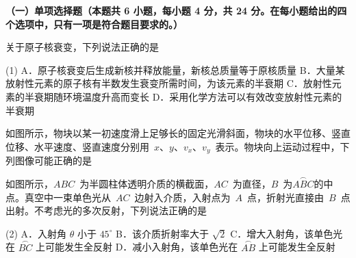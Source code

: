 

\textbf{（一）单项选择题（本题共 6 小题，每小题 4 分，共 24 分。在每小题给出的四个选项中，只有一项是符合题目要求的。）}

\begin{question}
关于原子核衰变，下列说法正确的是\gkblank

\begin{gkopts}(1)
  \task A．原子核衰变后生成新核并释放能量，新核总质量等于原核质量
  \task B．大量某放射性元素的原子核有半数发生衰变所需时间，为该元素的半衰期
  \task C．放射性元素的半衰期随环境温度升高而变长
  \task D．采用化学方法可以有效改变放射性元素的半衰期
\end{gkopts}
\end{question}

\begin{question}
如图所示，物块以某一初速度滑上足够长的固定光滑斜面，物块的水平位移、竖直位移、水平速度、竖直速度分别用~$x$、$y$、$v_{x}$、$v_{y}$~表示。物块向上运动过程中，下列图像可能正确的是\gkblank

\end{question}

\begin{question}
如图所示，$ABC$~为半圆柱体透明介质的横截面，$AC$~为直径，$B$~为$\overset{\frown}{ABC}$的中点。真空中一束单色光从~$AC$~边射入介质，入射点为~$A$~点，折射光直接由~$B$~点出射。不考虑光的多次反射，下列说法正确的是\gkblank


\begin{gkopts}(2)
  \task A．入射角 $\theta$ 小于 $45^{\circ}$
  \task B．该介质折射率大于 $\sqrt{2}$
  \task C．增大入射角，该单色光在 $\overset{\frown}{BC}$ 上可能发生全反射
  \task D．减小入射角，该单色光在 $\overset{\frown}{AB}$ 上可能发生全反射
\end{gkopts}
\end{question}

